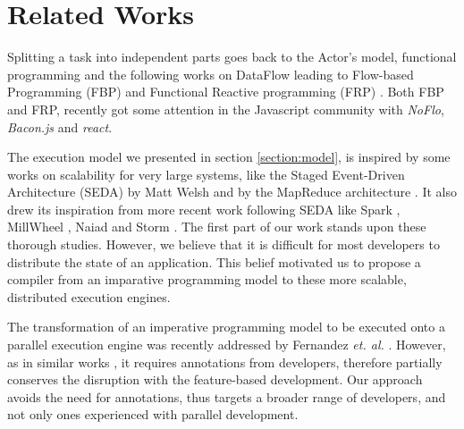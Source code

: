 \section{Related Works} \label{section:related}

Splitting a task into independent parts goes back to the Actor's model, functional programming \cite{Hughes1989} and the following works on Data\-Flow leading to Flow-based Programming (FBP) and Functional Reactive program\-ming (FRP) \cite{Elliott1997}.
Both FBP and FRP, recently got some attention in the Javascript community with \textit{NoFlo}, \textit{Bacon.js} and \textit{react}.

The execution model we presented in section \ref{section:model}, is inspired by some works on scalability for very large systems, like the Staged Event-Driven Architecture (SEDA) by Matt Welsh \cite{Welsh2000} and by the MapReduce architecture \cite{Dean2008}.
It also drew its inspiration from more recent work following SEDA like Spark \cite{Zaharia2012}, MillWheel \cite{Akidau2013}, Naiad \cite{McSherry} and Storm \cite{Toshniwal2014}.
The first part of our work stands upon these thorough studies.
However, we believe that it is difficult for most developers to distribute the state of an application.
This belief motivated us to propose a compiler from an imparative programming model to these more scalable, distributed execution engines.


The transformation of an imperative programming model to be executed onto a parallel execution engine was recently addressed by Fernandez \textit{et. al.} \cite{Fernandez2014a}.
However, as in similar works \cite{Power2010}, it requires annotations from developers, therefore partially conserves the disruption with the feature-based development.
Our approach avoids the need for annotations, thus targets a broader range of developers, and not only ones experienced with parallel development.

